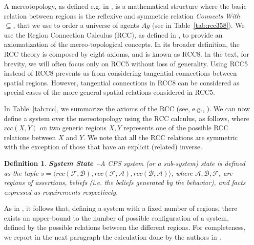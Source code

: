 \documentclass[conference]{IEEEtran}
\newcommand{\assertionRegion}{\mathcal{A}}
\newcommand{\beliefRegion}{\mathcal{B}}
\newcommand{\factRegion}{\mathcal{F}}
\newcommand{\rcc}{rcc}
\newcommand{\agentuniverse}{Ag}
\newtheorem{definition}{Definition}%
\begin{document}
A mereotopology, as defined e.g. in \autocite{Rachavelpula2017mereotopology},
is a mathematical structure where the basic relation between regions
is the reflexive and symmetric relation \emph{Connects With} $\subseteq$,
that we use to order a universe of agents
$\agentuniverse$ (see in Table~\ref{tab:rcc358}).  We use the Region Connection
Calculus (RCC), as defined in \autocite{bennettLogics,improvingRCC}, to provide
an axiomatization of the mereo-topological concepts. In its broader definition,
the RCC theory is composed by eight axioms, and is known as RCC8. In the text,
for brevity, we will often focus only on RCC5 without loss of generality. Using
RCC5 instead of RCC8 prevents us from considering tangential connections
between spatial regions. However, tangential connections in RCC8 can be
considered as special cases of the more general spatial relations considered in
RCC5.

In Table~\ref{tab:rcc}, we summarize the axioms of the RCC (see, e.g., \autocite{Grutter2008rcc}).  We can now define a system
over the mereotopology using the RCC calculus, as follows, where $\rcc(X,Y)$ on
two generic regions $X,Y$ represents one of the possible RCC relations between
$X$ and $Y$. We note that all the RCC relations are symmetric with the exception
of those that have an explicit (related) inverse.

\begin{definition}{\bf System State --}\label{def:opsystem}
	A CPS system (or a sub-system) state is defined as the tuple
	$s=\langle\rcc(\factRegion,\beliefRegion),\rcc(\factRegion,\assertionRegion),\rcc(\beliefRegion,\assertionRegion)\rangle$,
	where $\assertionRegion,\beliefRegion,\factRegion$, are regions of
	assertions, beliefs (i.e. the beliefs generated by the behavior), and
	facts expressed as requirements respectively.
\end{definition}

As in \autocite{Santaca2016abf}, it follows that, defining
a system with a fixed number of regions, there exists
an upper-bound to the number of possible configuration of a system, defined by
the possible relations between the different regions.
For completeness, we report in the next paragraph 
the calculation done by the authors in \autocite{Santaca2016abf}.
\end{document}
